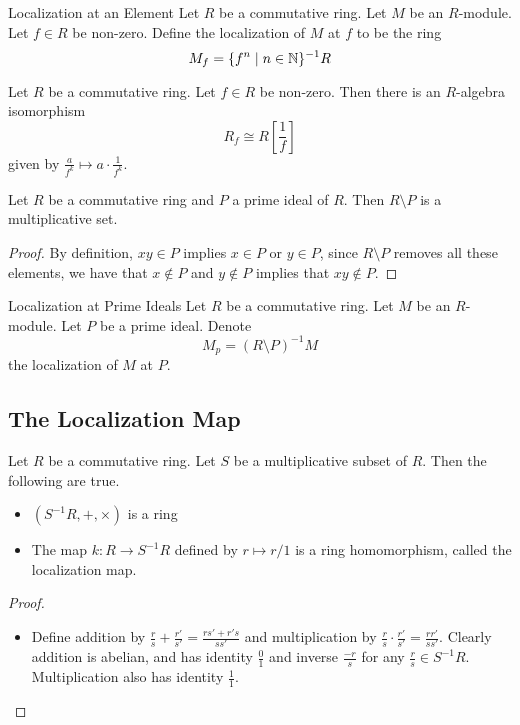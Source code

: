 \documentclass[a4paper]{article}
\begin{document}
\begin{defn}{Localization at an Element}{} Let $R$ be a commutative ring. Let $M$ be an $R$-module. Let $f\in R$ be non-zero. Define the localization of $M$ at $f$ to be the ring $$M_f=\{f^n\;|\;n\in\mathbb{N}\}^{-1}R$$
\end{defn}

\begin{lmm}{}{} Let $R$ be a commutative ring. Let $f\in R$ be non-zero. Then there is an $R$-algebra isomorphism $$R_f\cong R\left[\frac{1}{f}\right]$$ given by $\frac{a}{f^k}\mapsto a\cdot\frac{1}{f^k}$. 
\end{lmm}

\begin{lmm}{}{} Let $R$ be a commutative ring and $P$ a prime ideal of $R$. Then $R\setminus P$ is a multiplicative set. 
\begin{proof}
By definition, $xy\in P$ implies $x\in P$ or $y\in P$, since $R\setminus P$ removes all these elements, we have that $x\notin P$ and $y\notin P$ implies that $xy\notin P$. 
\end{proof}
\end{lmm}

\begin{defn}{Localization at Prime Ideals}{} Let $R$ be a commutative ring. Let $M$ be an $R$-module. Let $P$ be a prime ideal. Denote $$M_p=(R\setminus P)^{-1}M$$ the localization of $M$ at $P$. 
\end{defn}
\subsection{The Localization Map}
\begin{prp}{}{} Let $R$ be a commutative ring. Let $S$ be a multiplicative subset of $R$. Then the following are true. 
\begin{itemize}
\item $(S^{-1}R,+,\times)$ is a ring
\item The map $k:R\to S^{-1}R$ defined by $r\mapsto r/1$ is a ring homomorphism, called the localization map. 
\end{itemize}
\begin{proof}~\\
\begin{itemize}
\item Define addition by $\frac{r}{s}+\frac{r'}{s'}=\frac{rs'+r's}{ss'}$ and multiplication by $\frac{r}{s}\cdot\frac{r'}{s'}=\frac{rr'}{ss'}$. Clearly addition is abelian, and has identity $\frac{0}{1}$ and inverse $\frac{-r}{s}$ for any $\frac{r}{s}\in S^{-1}R$. Multiplication also has identity $\frac{1}{1}$. 
\end{itemize}
\end{proof}
\end{prp}
\end{document}

